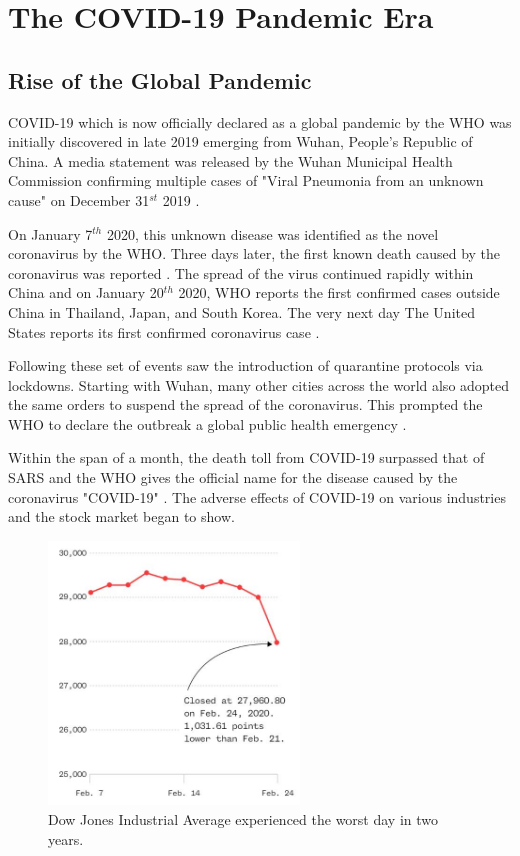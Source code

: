 
\chapter{The COVID-19 Pandemic Era} \label{The COVID-19 Pandemic Era} %


\section*{Rise of the Global Pandemic}

COVID-19 which is now officially declared as a global pandemic by the WHO was 
initially discovered in late 2019 emerging from Wuhan, People’s Republic of China.
A media statement was released by the Wuhan Municipal Health Commission confirming
multiple cases of "Viral Pneumonia from an unknown cause" on December 31$^{st}$ 2019 \cite{WMC2020}.

On January 7$^{th}$ 2020, this unknown disease was identified as the novel coronavirus by the WHO.
Three days later, the first known death caused by the coronavirus was reported \cite{WHOa2020}. The 
spread of the virus continued rapidly within China and on January 20$^{th}$ 2020, WHO reports 
the first confirmed cases outside China in Thailand, Japan, and South Korea. The very next day 
The United States reports its first confirmed coronavirus case \cite{EDW2020}. 

Following these set of events saw the introduction of quarantine protocols via lockdowns. 
Starting with Wuhan, many other cities across the world also adopted the same orders to 
suspend the spread of the coronavirus. This prompted the WHO to declare the outbreak a global public health emergency \cite{EDWa2020}. 

Within the span of a month, the death toll from COVID-19 surpassed that of SARS 
and the WHO gives the official name for the disease caused by the coronavirus "COVID-19" \cite{MCM2020}. 
The adverse effects of COVID-19 on various industries and the stock market began to 
show.

\begin{figure}[th]
\centering
\includegraphics[height=7cm]{Images/stockMarket.JPG}
\caption[Dow Jones]{Dow Jones Industrial Average experienced the worst day in two years. \cite{WBY2020}}
\label{fig:Dow Jones}
\end{figure}

